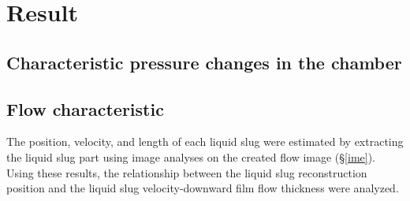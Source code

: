 \documentclass[aps,pre,preprint,groupedaddress,showkeys]{revtex4-2}
\begin{document}



\section{Result}\label{res}
\subsection{Characteristic pressure changes in the chamber}

\subsection{Flow characteristic}
The position, velocity, and length of each liquid slug were estimated by extracting the liquid slug part using image analyses on the created flow image (\S \ref{ime}).
Using these results, the relationship between the liquid slug reconstruction position and the liquid slug velocity-downward film flow thickness were analyzed.
\end{document}
